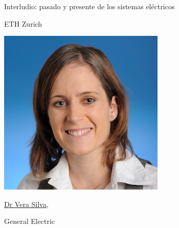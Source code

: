 \documentclass[aspectratio=169, usenames,svgnames,dvipsnames]{beamer}
\begin{document}
\begin{frame}{Interludio: \hspace{8mm}pasado y presente de los sistemas eléctricos}
\begin{minipage}[c]{0.3\linewidth}
\begin{center}
            ETH Zurich

            \vspace{3mm}
            \includegraphics[width=1\linewidth]{../figs/gabriela_hug.png}
        \end{center}
    \end{minipage}    
    \hfill%
    \begin{minipage}[c]{0.3\linewidth}
        \begin{center}    
            \vspace{-8.5mm}
            \href{https://www.youtube.com/watch?v=YlLlAyELKng}{Dr Vera Silva}, 
            
            General Electric


\end{center}
\end{minipage}
\end{frame}
\end{document}
